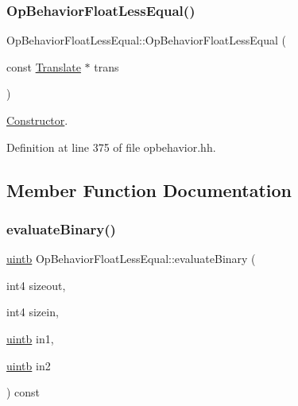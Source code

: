 \subsubsection{\texorpdfstring{OpBehaviorFloatLessEqual()}{OpBehaviorFloatLessEqual()}}
{\footnotesize\ttfamily Op\+Behavior\+Float\+Less\+Equal\+::\+Op\+Behavior\+Float\+Less\+Equal (\begin{DoxyParamCaption}\item[{const \mbox{\hyperlink{class_translate}{Translate}} $\ast$}]{trans }\end{DoxyParamCaption})\hspace{0.3cm}{\ttfamily [inline]}}



\mbox{\hyperlink{class_constructor}{Constructor}}. 



Definition at line 375 of file opbehavior.\+hh.



\subsection{Member Function Documentation}
\mbox{\label{class_op_behavior_float_less_equal_ad1a81020d476b4a23744e04e080ba8aa}} 
\subsubsection{\texorpdfstring{evaluateBinary()}{evaluateBinary()}}
{\footnotesize\ttfamily \mbox{\hyperlink{types_8h_a2db313c5d32a12b01d26ac9b3bca178f}{uintb}} Op\+Behavior\+Float\+Less\+Equal\+::evaluate\+Binary (\begin{DoxyParamCaption}\item[{int4}]{sizeout,  }\item[{int4}]{sizein,  }\item[{\mbox{\hyperlink{types_8h_a2db313c5d32a12b01d26ac9b3bca178f}{uintb}}}]{in1,  }\item[{\mbox{\hyperlink{types_8h_a2db313c5d32a12b01d26ac9b3bca178f}{uintb}}}]{in2 }\end{DoxyParamCaption}) const\hspace{0.3cm}{\ttfamily [virtual]}}



